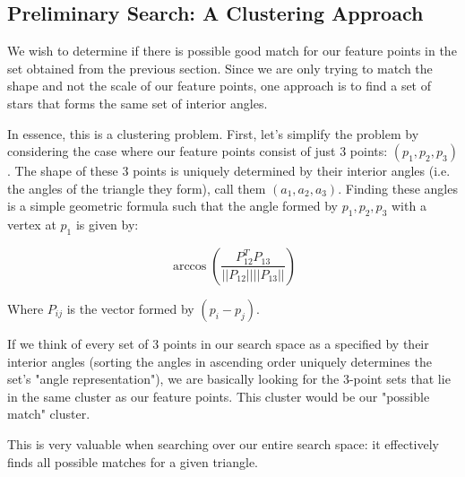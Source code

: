 \documentclass[paper=a4, fontsize=11pt]{scrartcl} %
\begin{document}
\subsection{Preliminary Search: A Clustering Approach}

We wish to determine if there is possible good match for our feature points in the set obtained from the previous section.  Since we are only trying to match the shape and not the scale of our feature points, one approach is to find a set of stars that forms the same set of interior angles.

In essence, this is a clustering problem. First, let's simplify the problem by considering the case where our feature points consist of just 3 points: $(p_1,p_2,p_3)$. The shape of these 3 points is uniquely determined by their interior angles (i.e. the angles of the triangle they form), call them $(a_1,a_2,a_3)$. Finding these angles is a simple geometric formula such that the angle formed by $p_1, p_2, p_3$ with a vertex at $p_1$ is given by:

$$\arccos\left(\frac{P_{12}^TP_{13}}{||P_{12}||||P_{13}||}\right)$$

Where $P_{ij}$ is the vector formed by $(p_i - p_j)$.

If we think of every set of 3 points in our search space as a specified by their interior angles (sorting the angles in ascending order uniquely determines the set's "angle representation"), we are basically looking for the 3-point sets that lie in the same cluster as our feature points. This cluster would be our "possible match" cluster.

This is very valuable when searching over our entire search space: it effectively finds all possible matches for a given triangle. 


\end{document}
